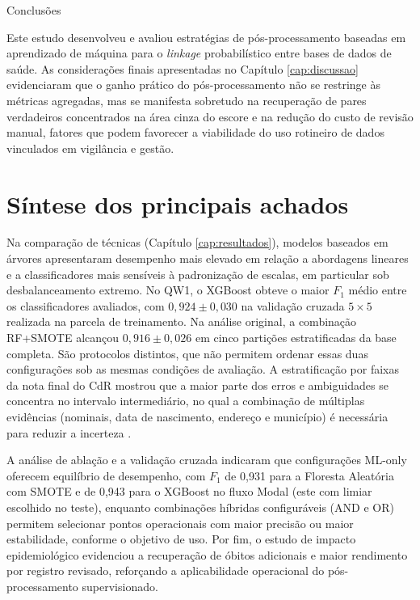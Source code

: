 \begin{chapter}{Conclusões}
\label{cap:conclusoes}

Este estudo desenvolveu e avaliou estratégias de pós-processamento baseadas em aprendizado de máquina para o \textit{linkage} probabilístico entre bases de dados de saúde. As considerações finais apresentadas no Capítulo \ref{cap:discussao} evidenciaram que o ganho prático do pós-processamento não se restringe às métricas agregadas, mas se manifesta sobretudo na recuperação de pares verdadeiros concentrados na área cinza do escore e na redução do custo de revisão manual, fatores que podem favorecer a viabilidade do uso rotineiro de dados vinculados em vigilância e gestão.

\section{Síntese dos principais achados}
\label{sec:cap7-sintese}

Na comparação de técnicas (Capítulo \ref{cap:resultados}), modelos baseados em árvores apresentaram desempenho mais elevado em relação a abordagens lineares e a classificadores mais sensíveis à padronização de escalas, em particular sob desbalanceamento extremo. No QW1, o XGBoost obteve o maior $F_1$ médio entre os classificadores avaliados, com $0{,}924 \pm 0{,}030$ na validação cruzada $5 \times 5$ realizada na parcela de treinamento. Na análise original, a combinação RF+SMOTE alcançou $0{,}916 \pm 0{,}026$ em cinco partições estratificadas da base completa. São protocolos distintos, que não permitem ordenar essas duas configurações sob as mesmas condições de avaliação. A estratificação por faixas da nota final do CdR mostrou que a maior parte dos erros e ambiguidades se concentra no intervalo intermediário, no qual a combinação de múltiplas evidências (nominais, data de nascimento, endereço e município) é necessária para reduzir a incerteza \cite{Breiman2001rf,Chen2016xgboost,Tyagi2025pprl}.

A análise de ablação e a validação cruzada indicaram que configurações ML-only oferecem equilíbrio de desempenho, com $F_1$ de 0,931 para a Floresta Aleatória com SMOTE e de 0,943 para o XGBoost no fluxo Modal (este com limiar escolhido no teste), enquanto combinações híbridas configuráveis (AND e OR) permitem selecionar pontos operacionais com maior precisão ou maior estabilidade, conforme o objetivo de uso. Por fim, o estudo de impacto epidemiológico evidenciou a recuperação de óbitos adicionais e maior rendimento por registro revisado, reforçando a aplicabilidade operacional do pós-processamento supervisionado.


\end{chapter}
